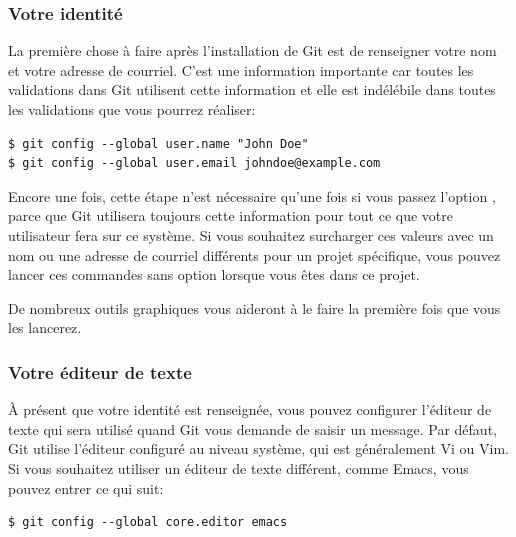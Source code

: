 \subsubsection{Votre identité}

La première chose à faire après l'installation de Git est de renseigner votre nom et votre adresse de courriel.
C'est une information importante car toutes les validations dans Git utilisent cette information et elle est indélébile dans toutes les validations que vous pourrez réaliser:
\begin{Schunk}
\begin{Verbatim}
$ git config --global user.name "John Doe"
$ git config --global user.email johndoe@example.com
\end{Verbatim}
\end{Schunk}

Encore une fois, cette étape n'est nécessaire qu'une fois si vous passez l'option , parce que Git utilisera toujours cette information pour tout ce que votre utilisateur fera sur ce système.
Si vous souhaitez surcharger ces valeurs avec un nom ou une adresse de courriel différents pour un projet spécifique, vous pouvez lancer ces commandes sans option  lorsque vous êtes dans ce projet.

De nombreux outils graphiques vous aideront à le faire la première fois que vous les lancerez.

\subsubsection{Votre éditeur de texte}

À présent que votre identité est renseignée, vous pouvez configurer l'éditeur de texte qui sera utilisé quand Git vous demande de saisir un message.
Par défaut, Git utilise l'éditeur configuré au niveau système, qui est généralement Vi ou Vim.
Si vous souhaitez utiliser un éditeur de texte différent, comme Emacs, vous pouvez entrer ce qui suit:
\begin{Schunk}
\begin{Verbatim}
$ git config --global core.editor emacs
\end{Verbatim}
\end{Schunk}


